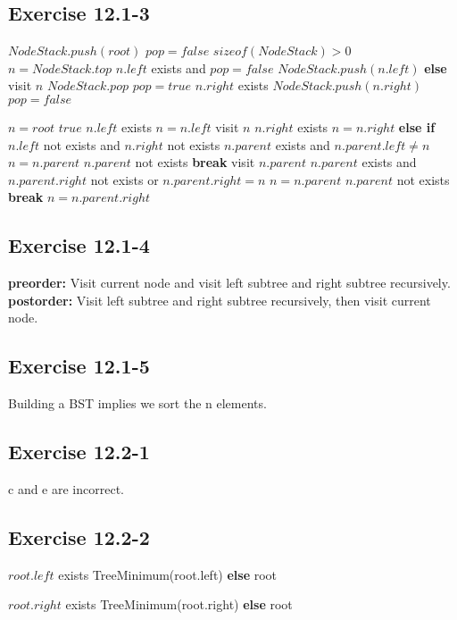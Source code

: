 \documentclass[12pt]{article}
\theoremstyle{definition}
\theoremstyle{remark}
\begin{document}
\subsection*{Exercise 12.1-3}
\begin{codebox}
\li $NodeStack.push(root)$
\li $pop=false$
\li \While $sizeof(NodeStack)>0$ \label{li:while}
\li \quad $n=NodeStack.top$
\li \quad \If $n.left$ exists and $pop = false$ \label{li:if}
\li \qquad $NodeStack.push(n.left)$
\li \quad \textbf{else}
\li \qquad visit $n$
\li \qquad $NodeStack.pop$
\li \qquad $pop = true$
\li \qquad \If $n.right$ exists \label{li:if}
\li \quad \qquad $NodeStack.push(n.right)$
\li \quad \qquad $pop = false$
\end{codebox}
\begin{codebox}
\li $n=root$
\li \While $true$ \label{li:while}
\li \quad \While $n.left$ exists \label{li:while}
\li \qquad $n=n.left$
\li \quad visit $n$
\li \quad \If $n.right$ exists \label{li:if}
\li \qquad $n=n.right$
\li \quad \textbf{else if} $n.left$ not exists and $n.right$ not exists
\li \qquad \While $n.parent$ exists and $n.parent.left\ne n$
\li \qquad \quad $n=n.parent$
\li \qquad \If $n.parent$ not exists \label{li:if}
\li \qquad \quad \textbf{break}
\li \qquad visit $n.parent$
\li \qquad \While $n.parent$ exists and $n.parent.right$ not exists or $n.parent.right=n$
\li \qquad \quad $n=n.parent$
\li \qquad \If $n.parent$ not exists \label{li:if}
\li \qquad \quad \textbf{break}
\li \qquad $n=n.parent.right$
\end{codebox}
\subsection*{Exercise 12.1-4}
\textbf{preorder:} Visit current node and visit left subtree and right subtree recursively.\\
\textbf{postorder:} Visit left subtree and right subtree recursively, then visit current node.
\subsection*{Exercise 12.1-5}
Building a BST implies we sort the n elements.
\subsection*{Exercise 12.2-1}
c and e are incorrect.
\subsection*{Exercise 12.2-2}
\begin{codebox}
\li \If $root.left$ exists \label{li:if}
\li \quad \Return TreeMinimum(root.left)
\li \textbf{else}
\li \quad \Return root
\end{codebox}
\begin{codebox}
\li \If $root.right$ exists \label{li:if}
\li \quad \Return TreeMinimum(root.right)
\li \textbf{else}
\li \quad \Return root
\end{codebox}
\end{document}
